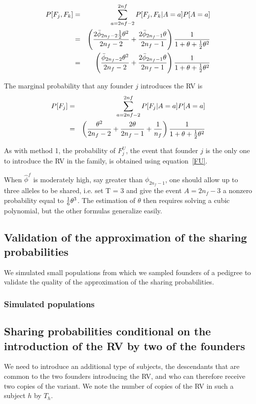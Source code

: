 \documentclass[12pt]{aastex}
\begin{document}
\begin{eqnarray}
P[F_j, F_k] &=& \sum_{a=2nf-2}^{2nf} P[F_j, F_k|A=a]P[A=a] \nonumber \\
&=& \left( \frac{2 \bar{\phi}_{2n_f-2} {1 \over 2} \theta^2}{2n_f-2} + \frac{ 2 \bar{\phi}_{2n_f-1} \theta}{2n_f-1} \right) \frac{1}{1 + \theta + {1 \over 2} \theta^2 }\nonumber \\
&=& \left( \frac{\bar{\phi}_{2n_f-2} \theta^2}{2n_f-2} + \frac{2 \bar{\phi}_{2n_f-1} \theta}{2n_f-1} \right) \frac{1}{1 + \theta + {1 \over 2} \theta^2 }
\end{eqnarray}

The marginal probability that any founder $j$ introduces the RV is 
\begin{eqnarray}
P[F_j] &=& \sum_{a=2nf-2}^{2nf} P[F_j|A=a]P[A=a] \nonumber \\
&=& \left( \frac{ \theta^2}{2n_f-2} +\frac{2 \theta}{2n_f-1} + \frac{1}{n_f} \right) \frac{1}{1 + \theta + {1 \over 2} \theta^2 }\nonumber \\
\end{eqnarray}

As with method 1, the probability of $F_j^U$, the event that founder $j$ is the only one to introduce the RV in the family, is obtained using equation~\ref{FU}.

When $\hat{\phi}^f$ is moderately high, say greater than $\phi_{2n_f-1}$, one should allow up to three alleles to be shared, i.e. set T = 3 and give the event $A = 2n_f-3$ a nonzero probability equal to ${1 \over 6} \theta^3$. The estimation of $\theta$ then requires solving a cubic polynomial, but the other formulas generalize easily. 

\subsection{Validation of the approximation of the sharing probabilities}

We simulated small populations from which we sampled founders of a pedigree to validate the quality of the approximation of the sharing probabilities.

\subsubsection{Simulated populations}


\appendix 

\subsection{Sharing probabilities conditional on the introduction of the RV by two of the founders}
\label{twointroduce}
We need to introduce an additional type of subjects, the descendants that are common to the two founders introducing the RV, and who can therefore receive two copies of the variant. We note the number of copies of the RV in such a subject $h$ by $T_h$.
\end{document}
